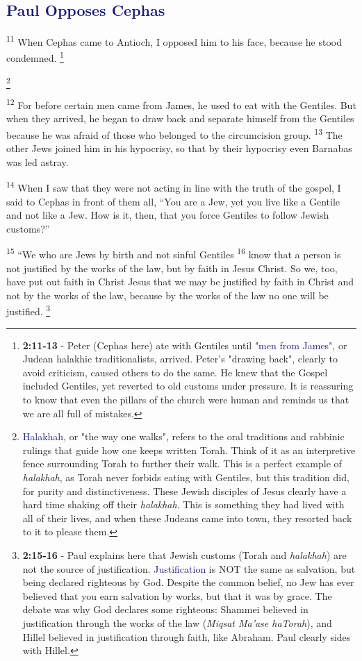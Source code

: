 \documentclass[12pt,twoside]{article}
\newcommand{\vs}[1]{\textsuperscript{#1}}
\newcommand{\vnote}[2]{%
  \begingroup
  \renewcommand\thefootnote{}%
  \footnote{\scriptsize \textbf{}#2}%
  \addtocounter{footnote}{-1}%
  \endgroup
}
\begin{document}
\subsection*{\textcolor{MidnightBlue}{\textbf{Paul Opposes Cephas}}}

\hspace{0.5cm} \vs{11} When Cephas came to Antioch, I opposed him to his face, because he stood condemned.\vnote{11}{\textbf{2:11-13} - Peter (Cephas here) ate with Gentiles until \textcolor{MidnightBlue}{"men from James"}, or Judean halakhic traditionalists, arrived. Peter's "drawing back", clearly to avoid criticism, caused others to do the same. He knew that the Gospel included Gentiles, yet reverted to old customs under pressure. It is reassuring to know that even the pillars of the church were human and reminds us that we are all full of mistakes.}\vnote{11}{\textcolor{MidnightBlue}{Halakhah}, or "the way one walks", refers to the oral traditions and rabbinic rulings that guide how one keeps written Torah. Think of it as an interpretive fence surrounding Torah to further their walk. This is a perfect example of \textit{halakhah}, as Torah never forbids eating with Gentiles, but this tradition did, for purity and distinctiveness. These Jewish disciples of Jesus clearly have a hard time shaking off their \textit{halakhah}. This is something they had lived with all of their lives, and when these Judeans came into town, they resorted back to it to please them.}
\vs{12} For before certain men came from James, he used to eat with the Gentiles. But when they arrived, he began to draw back and separate himself from the Gentiles because he was afraid of those who belonged to the circumcision group.
\vs{13} The other Jews joined him in his hypocrisy, so that by their hypocrisy even Barnabas was led astray.

\vs{14} When I saw that they were not acting in line with the truth of the gospel, I said to Cephas in front of them all, ``You are a Jew, yet you live like a Gentile and not like a Jew. How is it, then, that you force Gentiles to follow Jewish customs?''

\vs{15} ``We who are Jews by birth and not sinful Gentiles
\vs{16} know that a person is not justified by the works of the law, but by faith in Jesus Christ. So we, too, have put out faith in Christ Jesus that we may be justified by faith in Christ and not by the works of the law, because by the works of the law no one will be justified.\vnote{16}{\textbf{2:15-16} - Paul explains here that Jewish customs (Torah and \textit{halakhah}) are not the source of justification. \textcolor{MidnightBlue}{Justification} is NOT the same as salvation, but being declared righteous by God. Despite the common belief, no Jew has ever believed that you earn salvation by works, but that it was by grace. The debate was why God declares some righteous: Shammei believed in justification through the works of the law (\textit{Miqsat Ma'ase haTorah}), and Hillel believed in justification through faith, like Abraham. Paul clearly sides with Hillel.}
\end{document}
